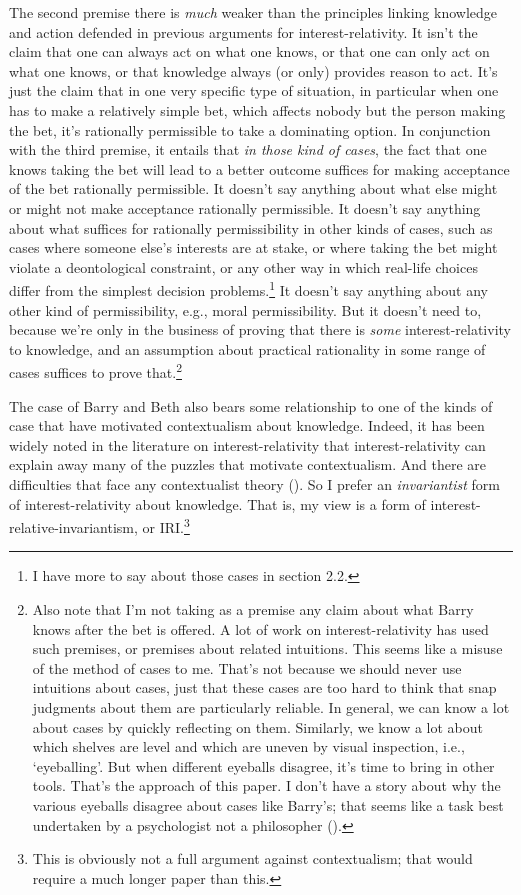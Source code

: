 \documentclass[
  10pt,
  letterpaper,
  DIV=11,
  numbers=noendperiod,
  twoside]{scrartcl}
\begin{document}
The second premise there is \emph{much} weaker than the principles
linking knowledge and action defended in previous arguments for
interest-relativity. It isn't the claim that one can always act on what
one knows, or that one can only act on what one knows, or that knowledge
always (or only) provides reason to act. It's just the claim that in one
very specific type of situation, in particular when one has to make a
relatively simple bet, which affects nobody but the person making the
bet, it's rationally permissible to take a dominating option. In
conjunction with the third premise, it entails that \emph{in those kind
of cases}, the fact that one knows taking the bet will lead to a better
outcome suffices for making acceptance of the bet rationally
permissible. It doesn't say anything about what else might or might not
make acceptance rationally permissible. It doesn't say anything about
what suffices for rationally permissibility in other kinds of cases,
such as cases where someone else's interests are at stake, or where
taking the bet might violate a deontological constraint, or any other
way in which real-life choices differ from the simplest decision
problems.\footnote{I have more to say about those cases in section 2.2.}
It doesn't say anything about any other kind of permissibility, e.g.,
moral permissibility. But it doesn't need to, because we're only in the
business of proving that there is \emph{some} interest-relativity to
knowledge, and an assumption about practical rationality in some range
of cases suffices to prove that.\footnote{Also note that I'm not taking
  as a premise any claim about what Barry knows after the bet is
  offered. A lot of work on interest-relativity has used such premises,
  or premises about related intuitions. This seems like a misuse of the
  method of cases to me. That's not because we should never use
  intuitions about cases, just that these cases are too hard to think
  that snap judgments about them are particularly reliable. In general,
  we can know a lot about cases by quickly reflecting on them.
  Similarly, we know a lot about which shelves are level and which are
  uneven by visual inspection, i.e., `eyeballing'. But when different
  eyeballs disagree, it's time to bring in other tools. That's the
  approach of this paper. I don't have a story about why the various
  eyeballs disagree about cases like Barry's; that seems like a task
  best undertaken by a psychologist not a philosopher
  ().}

The case of Barry and Beth also bears some relationship to one of the
kinds of case that have motivated contextualism about knowledge. Indeed,
it has been widely noted in the literature on interest-relativity that
interest-relativity can explain away many of the puzzles that motivate
contextualism. And there are difficulties that face any contextualist
theory (). So I
prefer an \emph{invariantist} form of interest-relativity about
knowledge. That is, my view is a form of interest-relative-invariantism,
or IRI.\footnote{This is obviously not a full argument against
  contextualism; that would require a much longer paper than this.}
\end{document}
